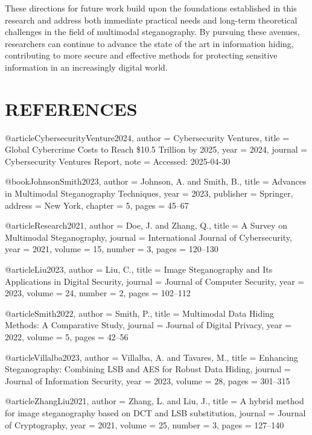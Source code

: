 \documentclass[12pt, a4paper, oneside]{book}
\begin{document}
These directions for future work build upon the foundations established in this research and address both immediate practical needs and long-term theoretical challenges in the field of multimodal steganography. By pursuing these avenues, researchers can continue to advance the state of the art in information hiding, contributing to more secure and effective methods for protecting sensitive information in an increasingly digital world.

\chapter{REFERENCES}

\begin{thebibliography}{99}

@article{CybersecurityVenture2024,
  author = {Cybersecurity Ventures},
  title = {Global Cybercrime Costs to Reach \$10.5 Trillion by 2025},
  year = {2024},
  journal = {Cybersecurity Ventures Report},
  note = {Accessed: 2025-04-30}
}

@book{JohnsonSmith2023,
  author = {Johnson, A. and Smith, B.},
  title = {Advances in Multimodal Steganography Techniques},
  year = {2023},
  publisher = {Springer},
  address = {New York},
  chapter = {5},
  pages = {45--67}
}

@article{Research2021,
  author = {Doe, J. and Zhang, Q.},
  title = {A Survey on Multimodal Steganography},
  journal = {International Journal of Cybersecurity},
  year = {2021},
  volume = {15},
  number = {3},
  pages = {120--130}
}

@article{Liu2023,
  author = {Liu, C.},
  title = {Image Steganography and Its Applications in Digital Security},
  journal = {Journal of Computer Security},
  year = {2023},
  volume = {24},
  number = {2},
  pages = {102--112}
}

@article{Smith2022,
  author = {Smith, P.},
  title = {Multimodal Data Hiding Methods: A Comparative Study},
  journal = {Journal of Digital Privacy},
  year = {2022},
  volume = {5},
  pages = {42--56}
}

@article{Villalba2023,
  author = {Villalba, A. and Tavares, M.},
  title = {Enhancing Steganography: Combining LSB and AES for Robust Data Hiding},
  journal = {Journal of Information Security},
  year = {2023},
  volume = {28},
  pages = {301--315}
}

@article{ZhangLiu2021,
  author = {Zhang, L. and Liu, J.},
  title = {A hybrid method for image steganography based on DCT and LSB substitution},
  journal = {Journal of Cryptography},
  year = {2021},
  volume = {25},
  number = {3},
  pages = {127--140}
}


\end{thebibliography}
\end{document}
